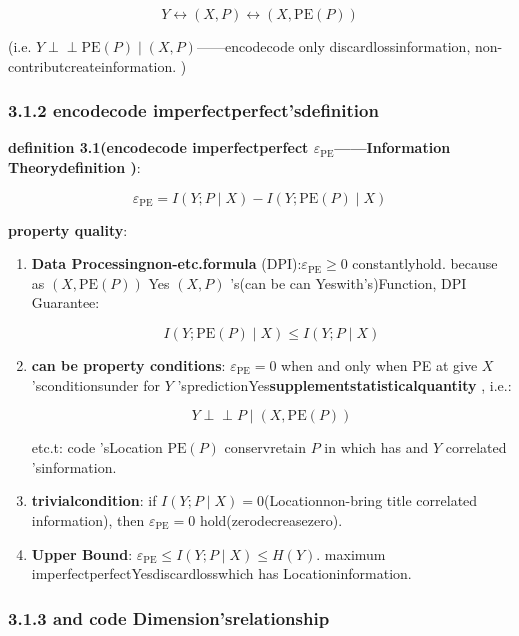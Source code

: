 \documentclass[
  12pt,
]{article}
\begin{document}
\[Y \leftrightarrow (X, P) \leftrightarrow (X, \text{PE}(P))\]

(i.e.
\(Y \perp\!\!\!\perp \text{PE}(P) \mid (X, P)\)------encodecode only discardlossinformation, non-contributcreateinformation. )

\subsubsection{3.1.2
encodecode imperfectperfect'sdefinition }\label{ux7f16ux7801ux4e0dux5b8cux7f8eux5ea6ux7684ux5b9aux4e49}

\textbf{definition  3.1(encodecode imperfectperfect
\(\varepsilon_{\text{PE}}\)------Information Theorydefinition )}: 

\[\boxed{\varepsilon_{\text{PE}} = I(Y; P \mid X) - I(Y; \text{PE}(P) \mid X)}\]

\textbf{property quality}: 

\begin{enumerate}
\def\labelenumi{\arabic{enumi}.}
\item
  \textbf{Data Processingnon-etc.formula }(DPI):\(\varepsilon_{\text{PE}} \geq 0\)
  constantlyhold. because as  \((X, \text{PE}(P))\) Yes \((X, P)\)
  's(can be can Yeswith's)Function, DPI Guarantee: 

  \[I(Y; \text{PE}(P) \mid X) \leq I(Y; P \mid X)\]
\item
  \textbf{can be property conditions}: \(\varepsilon_{\text{PE}} = 0\) when and only when  PE
  at give  \(X\) 'sconditionsunder for  \(Y\) 'spredictionYes\textbf{supplementstatisticalquantity }, i.e.: 

  \[Y \perp\!\!\!\perp P \mid (X, \text{PE}(P))\]

  etc.t: code 'sLocation \(\text{PE}(P)\) conservretain \(P\) in which has and  \(Y\)
  correlated 'sinformation. 
\item
  \textbf{trivialcondition}: if 
  \(I(Y; P \mid X) = 0\)(Locationnon-bring title correlated information), then 
  \(\varepsilon_{\text{PE}} = 0\) hold(zerodecreasezero). 
\item
  \textbf{Upper Bound}: \(\varepsilon_{\text{PE}} \leq I(Y; P \mid X) \leq H(Y)\). maximum imperfectperfectYesdiscardlosswhich has Locationinformation. 
\end{enumerate}

\subsubsection{3.1.3
and code Dimension'srelationship }\label{ux4e0eux7f16ux7801ux7ef4ux5ea6ux7684ux5173ux7cfb}
\end{document}
